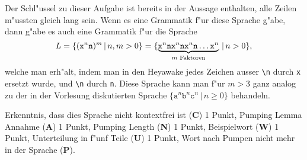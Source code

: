 \begin{diskussion}
Der Schl"ussel zu dieser Aufgabe ist bereits in der Aussage enthalten,
alle Zeilen m"ussten gleich lang sein.
Wenn es eine Grammatik f"ur diese Sprache g"abe, dann g"abe es auch
eine Grammatik f"ur die Sprache
\[
L=\{ (\texttt{x}^n\texttt{\\n})^m\,|\, n,m>0\}
=
\{
\underbrace{
\texttt{x}^n\texttt{\\n}
\texttt{x}^n\texttt{\\n}
\texttt{x}^n\texttt{\\n}
\dots
\texttt{x}^n}_{\text{$m$ Faktoren}}
\,|\,n>0
\},
\]
welche man erh"alt, indem man in den Heyawake jedes Zeichen ausser 
\texttt{\textbackslash n} durch \texttt{x}
ersetzt wurde, und \texttt{\textbackslash n} durch \texttt{n}.
Diese Sprache kann man f"ur $m>3$ ganz analog zu der in der Vorlesung
diskutierten Sprache $\{
\texttt{a}^n
\texttt{b}^n
\texttt{c}^n\,|\,n\ge 0\}$
behandeln.
\end{diskussion}

\begin{bewertung}
Erkenntnis, dass dies Sprache nicht kontextfrei ist ({\bf C}) 1 Punkt,
Pumping Lemma Annahme ({\bf A}) 1 Punkt,
Pumping Length ({\bf N}) 1 Punkt,
Beispielwort ({\bf W}) 1 Punkt,
Unterteilung in f"unf Teile ({\bf U}) 1 Punkt,
Wort nach Pumpen nicht mehr in der Sprache ({\bf P}).
\end{bewertung}

